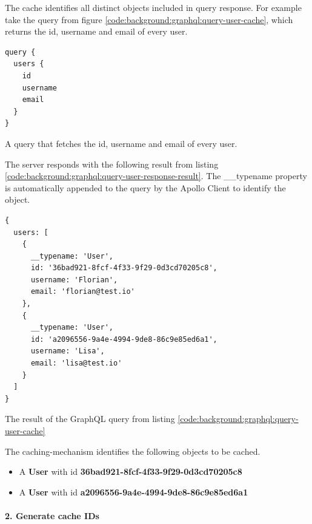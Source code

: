 The cache identifies all distinct objects included in query response. For example take the query from figure \ref{code:background:graphql:query-user-cache}, which returns the id, username and email of every user.

\ifshowListings
\begin{listing}[H]
    \begin{verbatim}
query {
  users {
    id
    username
    email
  }
}
    \end{verbatim}
    \caption{A query that fetches the id, username and email of every user.}\label{code:background:graphql:query-user-cache}
\end{listing}
\fi

The server responds with the following result from listing \ref{code:background:graphql:query-user-response-result}. The \_\_typename property is automatically appended to the query by the Apollo Client to identify the object.

\ifshowListings
\begin{listing}[H]
    \begin{verbatim}
{
  users: [
    {
      __typename: 'User',
      id: '36bad921-8fcf-4f33-9f29-0d3cd70205c8',
      username: 'Florian',
      email: 'florian@test.io'
    },
    {
      __typename: 'User',
      id: 'a2096556-9a4e-4994-9de8-86c9e85ed6a1',
      username: 'Lisa',
      email: 'lisa@test.io'
    }
  ]
}
    \end{verbatim}
    \caption{The result of the GraphQL query from listing \ref{code:background:graphql:query-user-cache}}\label{code:background:graphql:query-user-response-result}
\end{listing}
\fi

The caching-mechanism identifies the following objects to be cached.

\begin{itemize}
    \item A \textbf{User} with id \textbf{36bad921-8fcf-4f33-9f29-0d3cd70205c8}
    \item A \textbf{User} with id \textbf{a2096556-9a4e-4994-9de8-86c9e85ed6a1}
\end{itemize}

\paragraph{2. Generate cache IDs}\label{paragraph:background:graphql:apollo-server-client:data-normalization:generate-cache-ids}

